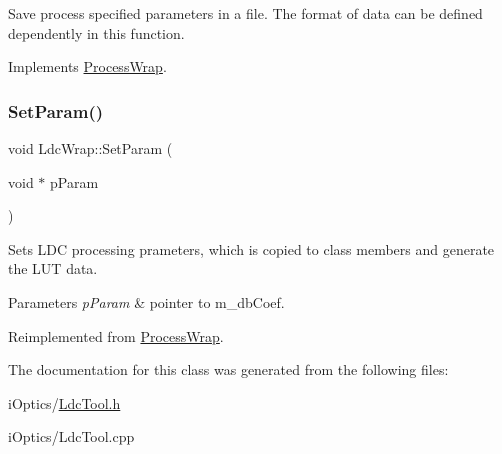 Save process specified parameters in a file. The format of data can be defined dependently in this function. 

Implements \mbox{\hyperlink{class_process_wrap_aa5d4361a42a7a65cac877beb6d4ffa97}{Process\+Wrap}}.

\mbox{\label{class_ldc_wrap_a0e99416d80b36d5da0faaa5a11da9ee7}} 
\subsubsection{\texorpdfstring{Set\+Param()}{SetParam()}}
{\footnotesize\ttfamily void Ldc\+Wrap\+::\+Set\+Param (\begin{DoxyParamCaption}\item[{void $\ast$}]{p\+Param }\end{DoxyParamCaption})\hspace{0.3cm}{\ttfamily [virtual]}}

Sets L\+DC processing prameters, which is copied to class members and generate the L\+UT data. 
\begin{DoxyParams}{Parameters}
{\em p\+Param} & pointer to m\+\_\+db\+Coef. \\
\hline
\end{DoxyParams}


Reimplemented from \mbox{\hyperlink{class_process_wrap_a6c7130837d4713b0462f42cfc25aca98}{Process\+Wrap}}.



The documentation for this class was generated from the following files\+:\begin{DoxyCompactItemize}
\item 
i\+Optics/\mbox{\hyperlink{_ldc_tool_8h}{Ldc\+Tool.\+h}}\item 
i\+Optics/Ldc\+Tool.\+cpp\end{DoxyCompactItemize}
